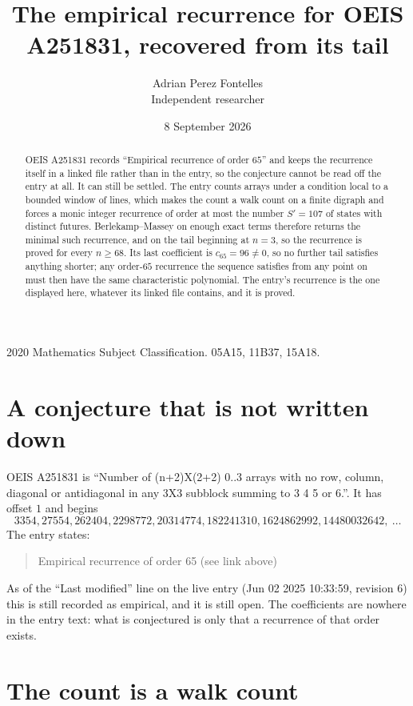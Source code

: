 \documentclass[11pt,a4paper]{article}
\title{The empirical recurrence for OEIS A251831, recovered from its tail}
\author{Adrian Perez Fontelles\\ \small Independent researcher}
\date{8 September 2026}
\theoremstyle{plain}
\theoremstyle{definition}
\begin{document}
\maketitle

\begin{abstract}
OEIS A251831 records ``Empirical recurrence of order $65$'' and keeps the recurrence itself in
a linked file rather than in the entry, so the conjecture cannot be read off the entry at all.
It can still be settled. The entry counts arrays under a condition local to a bounded window of
lines, which makes the count a walk count on a finite digraph and forces a monic integer
recurrence of order at most the number $S'=107$ of states with distinct futures. Berlekamp--Massey on
enough exact terms therefore returns the minimal such recurrence, and on the tail beginning at $n=3$, so the recurrence is proved for every $n\ge68$.
Its last coefficient is $c_{65}=96\neq0$, so no further tail satisfies anything
shorter; any order-$65$ recurrence the sequence satisfies from any point on must then have
the same characteristic polynomial. The entry's recurrence is the one displayed here, whatever
its linked file contains, and it is proved.
\end{abstract}

\noindent\small 2020 Mathematics Subject Classification. 05A15, 11B37, 15A18.\normalsize

\section{A conjecture that is not written down}

OEIS A251831 is ``Number of (n+2)X(2+2) 0..3 arrays with no row, column, diagonal or antidiagonal in any 3X3 subblock summing to 3 4 5 or 6.''. It has offset $1$ and begins
\[
3354, 27554, 262404, 2298772, 20314774, 182241310, 1624862992, 14480032642,\ \dots
\]
The entry states:
\begin{quote}
Empirical recurrence of order 65 (see link above)
\end{quote}
As of the ``Last modified'' line on the live entry (Jun 02 2025 10:33:59, revision 6)
this is still recorded as empirical, and it is still open. The coefficients are nowhere in the
entry text: what is conjectured is only that a recurrence of that order exists.

\section{The count is a walk count}
\end{document}
